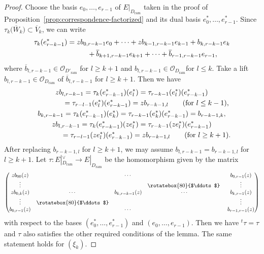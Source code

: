 \documentclass[pdftex]{sigma}
\numberwithin{equation}{section}
\begin{document}
\begin{proof}
Choose the basis $e_0,\dots,e_{r-1}$ of $E|_{D_{\mathrm{ram}}}$ taken in the proof of
Proposition~\ref{prop:correspondence-factorized}
and its dual basis $e^*_0,\dots,e^*_{r-1}$.
Since $\tau_k\big(\overline{W}_k\big)\subset \overline{V}_k$, we can write
\begin{gather*}
 \tau_k(e^*_{r-k-1}) =
 zb_{0,r-k-1}e_0+\cdots +zb_{k-1,r-k-1}e_{k-1}+b_{k,r-k-1}e_k\\
 \hphantom{\tau_k(e^*_{r-k-1}) =}{}
 +
 \overline{b}_{k+1,r-k-1}e_{k+1}+\cdots+\overline{b}_{r-1,r-k-1}e_{r-1},
\end{gather*}
where $\overline{b}_{l,r-k-1}\in{\mathcal O}_{D'_{\mathrm{ram}}}$ for $l\geq k+1$
and $b_{l,r-k-1}\in {\mathcal O}_{D_{\mathrm{ram}}}$for $l\leq k$.
Take a lift $b_{l,r-k-1}\in{\mathcal O}_{D_{\mathrm{ram}}}$ of $\overline{b}_{l,r-k-1}$
for $l\geq k+1$.
Then we have
\begin{gather*}
 zb_{l,r-k-1}=\tau_k(e^*_{r-k-1})(e^*_l) =
 \tau_{r-k-1}(e^*_l)(e^*_{r-k-1})
 \\
 \hphantom{zb_{l,r-k-1}}{}
 =\tau_{r-l-1}(e^*_l)(e^*_{r-k-1})
 =zb_{r-k-1,l}
 \qquad (\text{for $l\leq k-1$}),
 \\
 b_{k,r-k-1}=\tau_k(e^*_{r-k-1})(e^*_k)
 =
 \tau_{r-k-1}(e^*_k)(e^*_{r-k-1})
 =b_{r-k-1,k},
 \\
 zb_{l,r-k-1}
 =\tau_k(e^*_{r-k-1})(ze^*_l)
=\tau_{r-k-1}(ze^*_l)(e^*_{r-k-1})
 \\
\hphantom{zb_{l,r-k-1}}{}
=\tau_{r-l-1}(ze^*_l)(e^*_{r-k-1})=zb_{r-k-1,l}
 \qquad (\text{for $l\geq k+1$}).
\end{gather*}
After replacing $b_{r-k-1,l}$ for $l\geq k+1$,
we may assume $b_{l,r-k-1}=b_{r-k-1,l}$
for $l\geq k+1$.
Let
$\tau\colon E|_{D_{\mathrm{ram}}}^{\vee} \longrightarrow E|_{D_{\mathrm{ram}}}$
be the homomorphism given by the matrix
\[
 \begin{pmatrix}
 zb_{00}(z) & & \cdots & & b_{0,r-1}(z) \\
 \vdots & & & \rotatebox{80}{$\ddots$} \ & \vdots \\
 zb_{0,k}(z) & \cdots & b_{k,r-k-1}(z) & \cdots & b_{k,r-1}(z) \\
 \vdots & \rotatebox{80}{$\ddots$} & & & \vdots \\
 b_{0,r-1}(z) & & \cdots & & b_{r-1,r-1}(z)
 \end{pmatrix}
\]
with respect to the bases $(e^*_0,\dots,e^*_{r-1})$
and
$(e_0,\dots,e_{r-1})$.
Then we have $^t\tau=\tau$ and
$\tau$ also satisfies the other required conditions of the lemma.
The same statement holds for $(\xi_k)$.
\end{proof}
\end{document}

